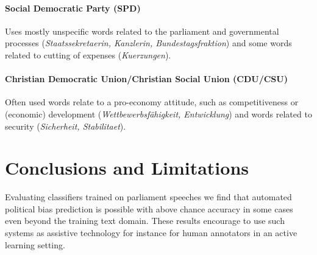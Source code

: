 \documentclass[11pt]{article}
\begin{document}
\paragraph{\bf Social Democratic Party (SPD)} Uses mostly unspecific words related to the parliament and governmental processes ({\em Staatssekretaerin, Kanzlerin, Bundestagsfraktion}) and some words related to cutting of expenses ({\em Kuerzungen}).
\paragraph{\bf Christian Democratic Union/Christian Social Union (CDU/CSU)}
Often used words relate to a pro-economy attitude, such as competitiveness or (economic) development ({\em Wettbewerbsf\"ahigkeit, Entwicklung}) and words related to security ({\em Sicherheit, Stabilitaet}). 







\section{Conclusions and Limitations}\label{sec:conclusion}
Evaluating classifiers trained on parliament speeches we find that automated political bias prediction is possible with above chance accuracy in some cases even beyond the training text domain. These results encourage to use such systems as assistive technology for instance for human annotators in an active learning setting. 
\end{document}
